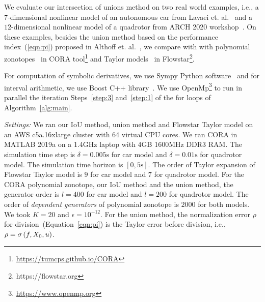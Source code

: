 We evaluate our intersection of unions method on two real world
examples, i.e., a $7$-dimensional nonlinear model of an autonomous car
from Lavaei et. al.~\cite{lavaei2020formal} and a $12$-dimensional
nonlinear model of a quadrotor from ARCH 2020
workshop~\cite{geretti2020arch}.  On these examples, besides the union
method based on the performance index~(\ref{eqn:pi}) proposed in
Althoff et. al.~\cite{althoff2008reachability}, we compare with
with polynomial zonotopes~\cite{althoff2013reachability} in CORA
tool\footnote{\url{https://tumcps.github.io/CORA}} and Taylor
models~\cite{chen2012taylor} in
Flowstar\footnote{https://flowstar.org}.

For computation of symbolic derivatives, we use Sympy Python
software~\cite{10.7717/peerj-cs.103} and for interval arithmetic, we
use Boost C++ library~\cite{bronnimann2006design}.  We use
OpenMp\footnote{\url{https://www.openmp.org}} to run in
parallel the iteration Steps~\ref{step:3} and~\ref{step:1} of the for loops of
Algorithm~\ref{alg:main}.

\emph{Settings:}  We
ran our IoU method, union method and Flowstar Taylor model on an AWS
c5a.16xlarge cluster with 64 virtual CPU cores.  We ran CORA in MATLAB
2019a on a 1.4GHz laptop with 4GB 1600MHz DDR3 RAM.  The simulation
time step is $\delta = 0.005\si{\second}$ for car model and $\delta =
0.01\si{\second}$ for quadrotor model.  The simulation time horizon is
$[0, 5\si{\second}]$.  The order of Taylor expansion of Flowstar
Taylor model is $9$ for car model and $7$ for quadrotor model.  For
the CORA polynomial zonotope, our IoU method and the union method, the
generator order is $l=400$ for car model and $l=200$ for quadrotor
model.  The order of \emph{dependent generators} of polynomial
zonotope is $2000$ for both models.  We took $K = 20$ and $\epsilon =
10^{-12}$.  For the union method, the normalization error $\rho$ for
division~(Equation~\ref{eqn:pi}) is the Taylor error before division,
i.e., $\rho = \sigma\left(f,X_0,u\right)$.
%

